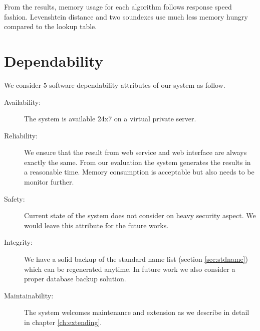 From the results, memory usage for each algorithm follows response speed fashion.
Levenshtein distance and two soundexes use much less memory hungry
compared to the lookup table.

\section{Dependability}

We consider 5 software dependability attributes \cite[]{dependability}
of our system as follow.

\begin{description}
  \item[Availability:] The system is available 24x7 on a virtual private server.
  \item[Reliability:] We ensure that the result from web service and
    web interface are always exactly the same. From our evaluation
    the system generates the results in a reasonable time. Memory
    consumption is acceptable but also needs to be monitor further.
  \item[Safety:] Current state of the system does not consider on heavy
    security aspect. We would leave this attribute for the future works.
  \item[Integrity:] We have a solid backup of the standard name list
    (section \ref{sec:stdname}) which can be regenerated anytime.
    In future work we also consider a proper database backup solution.
  \item[Maintainability:] The system welcomes maintenance and extension
    as we describe in detail in chapter \ref{ch:extending}.
\end{description}
